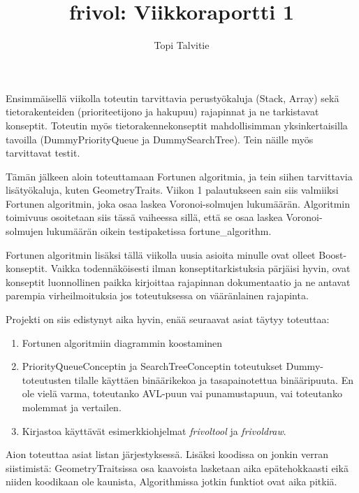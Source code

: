 \documentclass[a4paper, 11pt, finnish]{article}
\author{Topi Talvitie}
\title{frivol: Viikkoraportti 1}
\begin{document}
\maketitle

Ensimmäisellä viikolla toteutin tarvittavia perustyökaluja (Stack, Array) sekä tietorakenteiden (prioriteetijono ja hakupuu) rajapinnat ja ne tarkistavat konseptit. Toteutin myös tietorakennekonseptit mahdollisimman yksinkertaisilla tavoilla (DummyPriorityQueue ja DummySearchTree). Tein näille myös tarvittavat testit.

Tämän jälkeen aloin toteuttamaan Fortunen algoritmia, ja tein siihen tarvittavia lisätyökaluja, kuten GeometryTraits. Viikon 1 palautukseen sain siis valmiiksi Fortunen algoritmin, joka osaa laskea Voronoi-solmujen lukumäärän. Algoritmin toimivuus osoitetaan siis tässä vaiheessa sillä, että se osaa laskea Voronoi-solmujen lukumäärän oikein testipaketissa fortune\_algorithm.

Fortunen algoritmin lisäksi tällä viikolla uusia asioita minulle ovat olleet Boost-konseptit. Vaikka todennäköisesti ilman konseptitarkistuksia pärjäisi hyvin, ovat konseptit luonnollinen paikka kirjoittaa rajapinnan dokumentaatio ja ne antavat parempia virheilmoituksia jos toteutuksessa on vääränlainen rajapinta.

Projekti on siis edistynyt aika hyvin, enää seuraavat asiat täytyy toteuttaa:
\begin{enumerate}
\item Fortunen algoritmiin diagrammin koostaminen
\item PriorityQueueConceptin ja SearchTreeConceptin toteutukset Dummy-toteutusten tilalle käyttäen binäärikekoa ja tasapainotettua binääripuuta. En ole vielä varma, toteutanko AVL-puun vai punamustapuun, vai toteutanko molemmat ja vertailen.
\item Kirjastoa käyttävät esimerkkiohjelmat \emph{frivoltool} ja \emph{frivoldraw}.
\end{enumerate}
Aion toteuttaa asiat listan järjestyksessä. Lisäksi koodissa on jonkin verran siistimistä: GeometryTraitsissa osa kaavoista lasketaan aika epätehokkaasti eikä niiden koodikaan ole kaunista, Algorithmissa jotkin funktiot ovat aika pitkiä.
\end{document}
